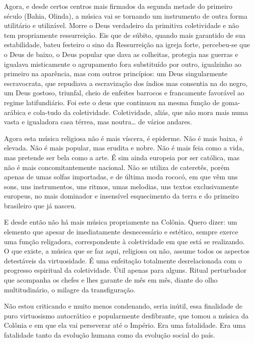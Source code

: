 Agora, e desde certos centros mais firmados da segunda metade do
primeiro século (Bahia, Olinda), a música vai se tornando um instrumento
de outra forma utilitário e utilizável. Morre o Deus verdadeiro da
primitiva coletividade e não tem propriamente ressurreição. Eis que de
súbito, quando mais garantido de sua estabilidade, bateu festeiro o sino
da Ressurreição na igreja forte, percebeu-se que o Deus de baixo, o Deus
popular que dava as colheitas, protegia nas guerras e igualava
misticamente o agrupamento fora substituído por outro, igualzinho ao
primeiro na aparência, mas com outros princípios: um Deus singularmente
escravocrata, que repudiava a escravização dos índios mas consentia na
do negro, um Deus gostoso, triunfal, cheio de enfeites barrocos e
francamente favorável ao regime latifundiário. Foi este o deus que
continuou na mesma função de goma-arábica e cola-tudo da coletividade.
Coletividade, aliás, que não mora mais numa vasta e igualadora casa
térrea, mas noutra\ldots{} de vários andares.

Agora esta música religiosa não é mais víscera, é epiderme. Não é mais
baixa, é elevada. Não é mais popular, mas erudita e nobre. Não é mais
feia como a vida, mas pretende ser bela como a arte. É sim ainda
europeia por ser católica, mas não é mais concomitantemente nacional.
Não se utiliza de cateretês, porém apenas de umas solfas importadas, e
de última moda rococó, em que vêm uns sons, uns instrumentos, uns
ritmos, umas melodias, uns textos exclusivamente europeus, no mais
dominador e insensível esquecimento da terra e do primeiro brasileiro
que já nasceu.

E desde então não há mais música propriamente na Colônia. Quero dizer:
um elemento que apesar de imediatamente desnecessário e estético, sempre
exerce uma função religadora, correspondente à coletividade em que está
se realizando. O que existe, a música que se faz aqui, religiosa ou não,
assume todos os aspectos detestáveis da virtuosidade. É uma enfeitação
totalmente desrelacionada com o progresso espiritual da coletividade.
Útil apenas para alguns. Ritual perturbador que acompanha os chefes e
lhes garante de mês em mês, diante do olho multitudinário, o milagre da
transfiguração.

Não estou criticando e muito menos condenando, seria inútil, essa
finalidade de puro virtuosismo autocrático e popularmente desfibrante,
que tomou a música da Colônia e em que ela vai perseverar até o Império.
Era uma fatalidade. Era uma fatalidade tanto da evolução humana como da
evolução social do país.

